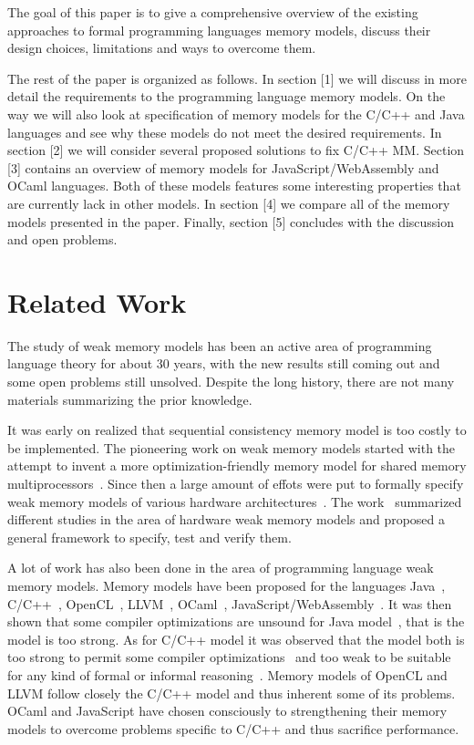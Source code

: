 \documentclass[a4paper,twoside,11pt]{article}
\numberwithin{equation}{section}
\begin{document}
The goal of this paper is to give a comprehensive overview of 
the existing approaches to formal programming languages memory models,
discuss their design choices, limitations and ways to overcome them.   

The rest of the paper is organized as follows.
In section [1] we will discuss in more detail the requirements to the programming language memory models.
On the way we will also look at specification of memory models for the C/C++ and Java languages
and see why these models do not meet the desired requirements.
In section [2] we will consider several proposed solutions to fix C/C++ MM. 
Section [3] contains an overview of memory models for JavaScript/WebAssembly and OCaml languages. 
Both of these models features some interesting properties that are currently lack in other models.
In section [4] we compare all of the memory models presented in the paper.
Finally, section [5] concludes with the discussion and open problems. 

\section{Related Work}

The study of weak memory models has been an active 
area of programming language theory for about 30 years,
with the new results still coming out and some open problems still unsolved.
Despite the long history, there are not many materials summarizing the prior knowledge.

It was early on realized that sequential consistency memory model is too costly to be implemented. 
The pioneering work on weak memory models started with the attempt to 
invent a more optimization-friendly memory model 
for shared memory multiprocessors~\cite{Adve:PhD93, Adve:Comp96}.
Since then a large amount of effots were put to formally specify weak memory models of various 
hardware architectures~\cite{Chong-ASPLOS08, Alglave-DAMP09, Sewell-al:CACM10, Sarkar-al:PLDI11, Flur-al:POPL16}.
The work~\cite{Alglave-al:TOPLAS14} summarized different studies in the area 
of hardware weak memory models and proposed a general 
framework to specify, test and verify them.

A lot of work has also been done in the area of programming language weak memory models.
Memory models have been proposed for the languages
Java~\cite{Manson-al:POPL05}, C/C++~\cite{Boehm-Adve:PLDI08, Batty-al:POPL11}, 
OpenCL~\cite{Batty-el:POPL16}, LLVM~\cite{Chakraborty-Vafeiadis:CGO17}, 
OCaml~\cite{Dolan-al:PLDI18}, JavaScript/WebAssembly~\cite{Watt-el:PLDI2020}.
It was then shown that some compiler optimizations are unsound 
for Java model~\cite{Sevcik-Aspinall:ECOOP08}, that is the model is too strong.
As for C/C++ model it was observed that the model both is too strong 
to permit some compiler optimizations~\cite{Vafeiadis-al:POPL15} and too weak to 
be suitable for any kind of formal or informal reasoning~\cite{Boehm-Demsky:MSPC14}. 
Memory models of OpenCL and LLVM follow closely the C/C++ model
and thus inherent some of its problems.
OCaml and JavaScript have chosen consciously to strengthening their memory models
to overcome problems specific to C/C++ and thus sacrifice performance. 
\end{document}
